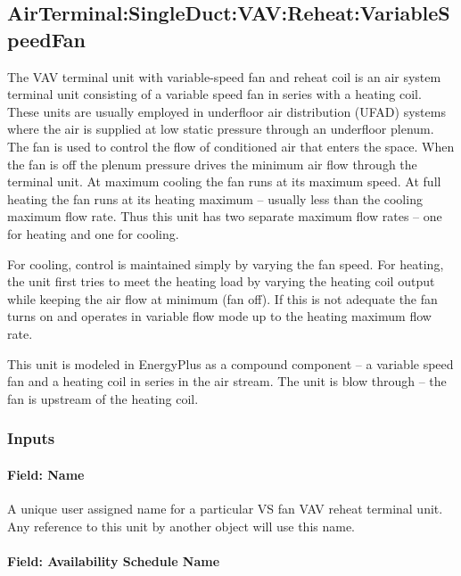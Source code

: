\subsection{AirTerminal:SingleDuct:VAV:Reheat:VariableSpeedFan}\label{airterminalsingleductvavreheatvariablespeedfan}

The VAV terminal unit with variable-speed fan and reheat coil is an air system terminal unit consisting of a variable speed fan in series with a heating coil. These units are usually employed in underfloor air distribution (UFAD) systems where the air is supplied at low static pressure through an underfloor plenum. The fan is used to control the flow of conditioned air that enters the space. When the fan is off the plenum pressure drives the minimum air flow through the terminal unit. At maximum cooling the fan runs at its maximum speed. At full heating the fan runs at its heating maximum -- usually less than the cooling maximum flow rate. Thus this unit has two separate maximum flow rates -- one for heating and one for cooling.

For cooling, control is maintained simply by varying the fan speed. For heating, the unit first tries to meet the heating load by varying the heating coil output while keeping the air flow at minimum (fan off). If this is not adequate the fan turns on and operates in variable flow mode up to the heating maximum flow rate.

This unit is modeled in EnergyPlus as a compound component -- a variable speed fan and a heating coil in series in the air stream. The unit is blow through -- the fan is upstream of the heating coil.

\subsubsection{Inputs}\label{inputs-3-000}

\paragraph{Field: Name}\label{field-name-3-000}

A unique user assigned name for a particular VS fan VAV reheat terminal unit. Any reference to this unit by another object will use this name.

\paragraph{Field: Availability Schedule Name}\label{field-availability-schedule-name-3}

